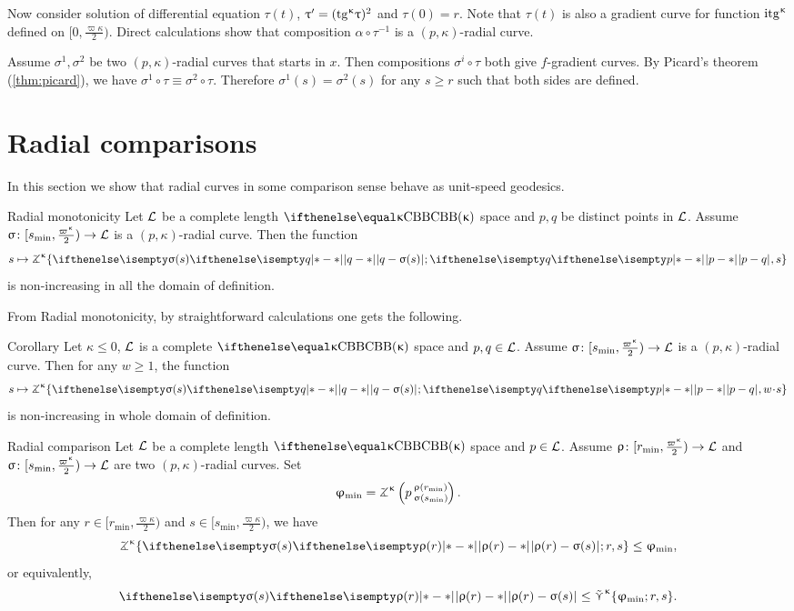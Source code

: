 Now consider solution of differential equation $\tau(t)$, $\uptau'=(\mathrm{tg}^{\upkappa}\uptau)^2$ and $\tau(0)=r$. 
Note that $\tau(t)$ is also a gradient curve  for function $\mathrm{itg}^{\upkappa}$ defined on $[0,\tfrac{\varpi\kappa}2)$.
Direct calculations show that composition $\alpha\circ\tau^{-1}$ 
is a $(p,\kappa)$-radial curve.

 Assume $\sigma^1,\sigma^2$ be two $(p,\kappa)$-radial curves that starts in $x$.
Then compositions $\sigma^i\circ\tau$ both give $f$-gradient curves.
By Picard's theorem (\ref{thm:picard}), we have
$\sigma^1\circ\tau 
\equiv 
\sigma^2\circ\tau$.
Therefore $\sigma^1(s)=\sigma^2(s)$ 
for any $s\ge r$ such that both sides are defined.
\qeds

\section{Radial comparisons}

In this section we show that radial curves in some comparison sense behave as unit-speed geodesics.

\begin{thm}{Radial monotonicity}\label{rad-mon}
Let $\mathcal{L}$ be a complete length $\Alex{\kappa}$ space and
$p, q$ be distinct points in $\mathcal{L}$.
Assume $\sigma\:  [s_{\min},\tfrac{\varpi\kappa}2)\to \spc{L}$
is a $(p,\kappa)$-radial curve.
Then the function 
\[s\mapsto 
\tangle\mc\kappa\{
\dist{q}{\sigma(s)}{};
\dist{p}{q}{},
s
\}\]
is non-increasing in all the domain of definition.
\end{thm}

From Radial monotonicity,
by straightforward calculations one gets the following.

\begin{thm}{Corollary}\label{cor:rad-comp}
Let $\kappa\le0$,
$\mathcal{L}$ is a complete $\Alex\kappa$ space
and $p, q\in \spc{L}$.
Assume $\sigma\:[s_{\min},\tfrac{\varpi\kappa}2)\to \spc{L}$ is a $(p,\kappa)$-radial curve.
Then for any $w\ge 1$, 
the function
\[
s\mapsto \tangle\mc\kappa\{\dist{q}{\sigma(s)}{};\dist{p}{q}{},w\cdot s\}
\]
is non-increasing in whole domain of definition.
\end{thm}


\begin{thm}{Radial comparison}\label{rad-comp}
Let $\mathcal{L}$ be a complete length $\Alex{\kappa}$ space 
and $p\in \spc{L}$.
Assume $\rho\:  [r_{\min},\tfrac{\varpi\kappa}2)\to \spc{L}$
and    $\sigma\:[s_{\min},\tfrac{\varpi\kappa}2)\to \spc{L}$
are two $(p,\kappa)$-radial curves.
Set
\[\phi_{\min}=\angkk\kappa p{\rho(r_{\min})}{\sigma(s_{\min})}.
\]
Then for any $r\in[r_{\min},\tfrac{\varpi\kappa}2)$ and  $s\in[s_{\min},\tfrac{\varpi\kappa}2)$,
we have
\[
\tangle\mc\kappa\{\dist{\rho(r)}{\sigma(s)}{};r,s\}
\le \phi_{\min},
\]
or equivalently,
\[
\dist{\rho(r)}{\sigma(s)}{}
\le \side\kappa\{\phi_{\min};r,s\}.
\]

\end{thm}


